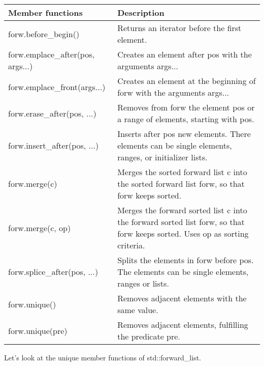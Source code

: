 \begin{longtable}[c]{|l|l|}
\hline
\textbf{Member functions}         & \textbf{Description}                                                                           \\ \hline
\endfirsthead
%
\endhead
%
forw.before\_begin()              & Returns an iterator before the first element.                                                  \\ \hline
forw.emplace\_after(pos, args...) & Creates an element after pos with the arguments args...                                        \\ \hline
forw.emplace\_front(args...)      & Creates an element at the beginning of forw with the arguments args...                         \\ \hline
forw.erase\_after(pos, ...)       & Removes from forw the element pos or a range of elements, starting with pos.                   \\ \hline
forw.insert\_after(pos, ...) & Inserts after pos new elements. There elements can be single elements, ranges, or initializer lists.                        \\ \hline
forw.merge(c)                     & Merges the sorted forward list c into the sorted forward list forw, so that forw keeps sorted. \\ \hline
forw.merge(c, op)            & Merges the forward sorted list c into the forward sorted list forw, so that forw keeps sorted. Uses op as sorting criteria. \\ \hline
forw.splice\_after(pos, ...) & Splits the elements in forw before pos. The elements can be single elements, ranges or lists.                               \\ \hline
forw.unique()                     & Removes adjacent elements with the same value.                                                 \\ \hline
forw.unique(pre)                  & Removes adjacent elements, fulfilling the predicate pre.                                       \\ \hline
\end{longtable}

Let’s look at the unique member functions of std::forward\_list.


